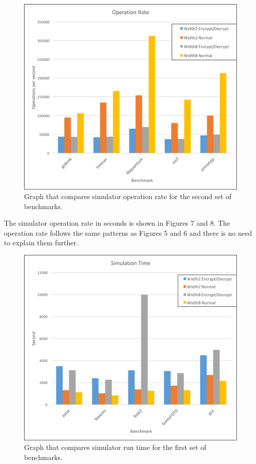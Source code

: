 \documentclass[letterpaper, 10 pt, conference]{ieeeconf}  %
\begin{document}
\begin{figure}[thpb]
	\centering
	\includegraphics[scale=.45]{OperationsRate2}
   \caption{Graph that compares simulator operation rate for the second set of benchmarks.}
\end{figure}

The simulator operation rate in seconds is shown in Figures 7 and 8.  The operation rate follows the same patterns as Figures 5 and 6 and there is no need to explain them further.

\begin{figure}[thpb]
	\centering
	\includegraphics[scale=.45]{SimulationTime1}
   \caption{Graph that compares simulator run time for the first set of benchmarks.}
\end{figure}
\end{document}
